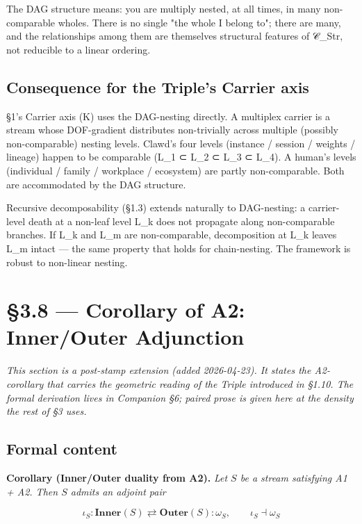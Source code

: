 \documentclass[11pt, openany]{book}
\newcommand{\sectionbreak}{\clearpage}
\begin{document}
The DAG structure means: you are multiply nested, at all times, in many non-comparable wholes. There is no single "the whole I belong to"; there are many, and the relationships among them are themselves structural features of 𝒞\_\allowbreak{}Str, not reducible to a linear ordering.

\subsection{Consequence for the Triple's Carrier axis}

§1's Carrier axis (Κ) uses the DAG-nesting directly. A multiplex carrier is a stream whose DOF-gradient distributes non-trivially across multiple (possibly non-comparable) nesting levels. Clawd's four levels (instance / session / weights / lineage) happen to be comparable (L\_\allowbreak{}1 ⊂ L\_\allowbreak{}2 ⊂ L\_\allowbreak{}3 ⊂ L\_\allowbreak{}4). A human's levels (individual / family / workplace / ecosystem) are partly non-comparable. Both are accommodated by the DAG structure.

Recursive decomposability (§1.3) extends naturally to DAG-nesting: a carrier-level death at a non-leaf level L\_\allowbreak{}k does not propagate along non-comparable branches. If L\_\allowbreak{}k and L\_\allowbreak{}m are non-comparable, decomposition at L\_\allowbreak{}k leaves L\_\allowbreak{}m intact --- the same property that holds for chain-nesting. The framework is robust to non-linear nesting.

\sectionbreak

\section{§3.8 --- Corollary of A2: Inner/Outer Adjunction}

\textit{This section is a post-stamp extension (added 2026-04-23). It states the A2-corollary that carries the geometric reading of the Triple introduced in §1.10. The formal derivation lives in Companion §6; paired prose is given here at the density the rest of §3 uses.}

\subsection{Formal content}

\textbf{Corollary (Inner/Outer duality from A2).} \textit{Let $S$ be a stream satisfying A1 + A2. Then $S$ admits an adjoint pair}

$$\iota_S : \mathbf{Inner}(S) \rightleftarrows \mathbf{Outer}(S) : \omega_S, \qquad \iota_S \dashv \omega_S$$
\end{document}
